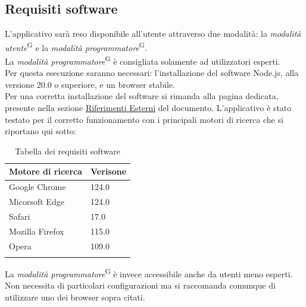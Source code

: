     \subsection{Requisiti software}\label{sec:requisiti_e_compatibilità:software}
    L'applicativo sarà reso disponibile all'utente attraverso due modalità: la \textit{modalità utente}\textsuperscript{G} e la \textit{modalità programmatore}\textsuperscript{G}.\\
    La \textit{modalità programmatore}\textsuperscript{G} è consigliata solamente ad utilizzatori esperti. \\
    Per questa esecuzione saranno necessari: l'installazione del software Node.js, alla versione 20.0 o superiore, e un browser stabile. \\
    Per una corretta installazione del software si rimanda alla pagina dedicata, presente nella sezione \hyperref[sec:riferimenti_esterni]{Riferimenti Esterni} del documento. 
    L'applicativo è stato testato per il corretto funzionamento con i principali motori di ricerca che si riportano qui sotto:
    \begin{xltabular}{\textwidth}{ X | X}

        \textbf{\color{white} Motore di ricerca} & \textbf{\color{white} Verisone}\\ 
        \hline
        \endhead

        Google Chrome & 124.0 \\
        \hline

        Micorsoft Edge & 124.0 \\
        \hline
        
        Safari & 17.0 \\
        \hline

        Mozilla Firefox & 115.0 \\
        \hline

        Opera & 109.0 \\
        \hline
        
        \caption{Tabella dei requisiti software}
        \label{tab:requisiti:soft}
    \end{xltabular}
    \noindent La \textit{modalità programmatore}\textsuperscript{G} è invece accessibile anche da utenti meno esperti. Non necessita di particolari configurazioni ma si raccomanda 
    comunque di utilizzare uno dei browser sopra citati. \\



